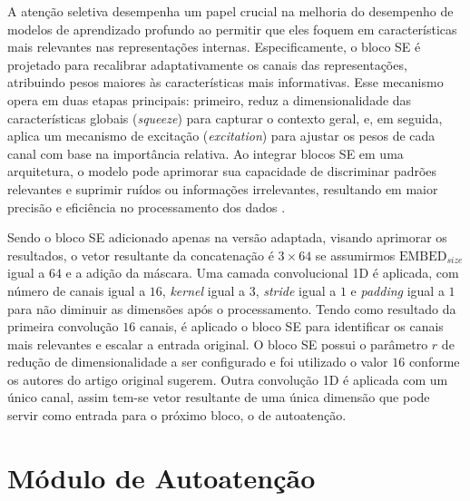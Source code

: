 A atenção seletiva desempenha um papel crucial na melhoria do desempenho de modelos de aprendizado profundo ao permitir que eles foquem em características mais relevantes nas representações internas. Especificamente, o bloco \gls{SE} é projetado para recalibrar adaptativamente os canais das representações, atribuindo pesos maiores às características mais informativas. Esse mecanismo opera em duas etapas principais: primeiro, reduz a dimensionalidade das características globais (\textit{squeeze}) para capturar o contexto geral, e, em seguida, aplica um mecanismo de excitação (\textit{excitation}) para ajustar os pesos de cada canal com base na importância relativa. Ao integrar blocos SE em uma arquitetura, o modelo pode aprimorar sua capacidade de discriminar padrões relevantes e suprimir ruídos ou informações irrelevantes, resultando em maior precisão e eficiência no processamento dos dados \cite{huSqueezeandExcitationNetworks2018}.

Sendo o bloco \gls{SE} adicionado apenas na versão adaptada, visando aprimorar os resultados, o vetor resultante da concatenação é $3\times64$ se assumirmos $\text{EMBED}_{size}$ igual a $64$ e a adição da máscara. Uma camada convolucional 1D é aplicada, com número de canais igual a $16$, \textit{kernel} igual a 3, \textit{stride} igual a $1$ e \textit{padding} igual a $1$ para não diminuir as dimensões após o processamento. Tendo como resultado da primeira convolução $16$ canais, é aplicado o bloco \gls{SE} para identificar os canais mais relevantes e escalar a entrada original. O bloco \gls{SE} possui o parâmetro $r$ de redução de dimensionalidade a ser configurado e foi utilizado o valor $16$ conforme os autores do artigo original sugerem. Outra convolução 1D é aplicada com um único canal, assim tem-se vetor resultante de uma única dimensão que pode servir como entrada para o próximo bloco, o de autoatenção.

\section{Módulo de Autoatenção}
\label{subsec:cap4_mod_self_attnn}

